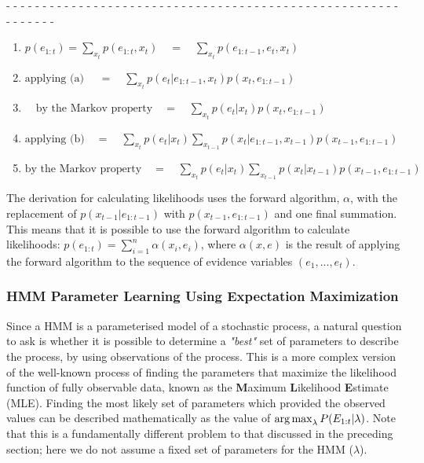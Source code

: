 \begin{center}
- - - - - - - - - - - - - - - - - - - - - - - - - - - - - - - - - - - - - - - - - - - - - - - - - - - - - - - - - - - - - 
\end{center}


\begin{enumerate}

\item {\hfil $p(e_{1:t}) = \sum_{x_t}p(e_{1:t}, x_t) \quad = \quad \sum_{x_t}p({e_{1:t-1}, e_t, x_t}) $
}
\item {\hfil $\text{applying (a) } \quad= \quad
\sum_{x_t}{p(e_t | e_{1:t-1}, x_t)p(x_t, e_{1:t-1})}$
}
\item {\hfil $\quad \text{by the Markov property} 
\quad = \quad \sum_{x_t}p(e_t | x_t)p(x_t, e_{1:t-1})$
}

\item {\hfil $\text{applying (b)} \quad =  \quad
\sum_{x_t}p(e_t | x_t) \sum_{x_{t-1}}p(x_t|e_{1:t-1}, x_{t-1}) p(x_{t-1},e_{1:t-1})$
}

\item {\hfil $\text{by the Markov property} \quad = \quad 
\sum_{x_t}{p(e_t | x_t)\sum_{x_{t-1}}p(x_t|x_{t-1}) p(x_{t-1},e_{1:t-1})}$
}

\end{enumerate}

The derivation for calculating likelihoods uses the forward algorithm, $\alpha$, with the replacement of  $p(x_{t-1}|e_{1:t-1})$ with $p(x_{t-1}, e_{1:t-1})$ and one final summation. This means that it is possible to use the forward algorithm to calculate likelihoods: $p(e_{1:t}) = \sum_{i=1}^{n} \alpha(x_i, e_i)$, where $\alpha(x, e)$ is the result of applying the forward algorithm to the sequence of evidence variables $(e_1, ..., e_t)$.



\subsubsection{HMM Parameter Learning Using Expectation Maximization}
Since a HMM is a parameterised model of a stochastic process, a natural question to ask is whether it is possible to determine a \textit{"best"} set of parameters to describe the process, by using observations of the process. This is a more complex version of the well-known process of finding the parameters that maximize the likelihood function of fully observable data, known as the \textbf{M}aximum \textbf{L}ikelihood \textbf{E}stimate (MLE). Finding the most likely set of parameters which provided the observed values can be described mathematically as the value of $\operatorname*{arg\,max}_{\lambda} P(E_{1:t} | \lambda)$. Note that this is a fundamentally different problem to that discussed in the preceding section; here we do not assume a fixed set of parameters for the HMM ($\lambda$).

